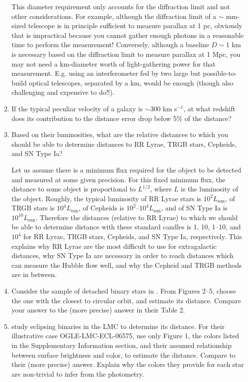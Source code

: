 \begin{enumerate}
\begin{answer}
This diameter requirement only accounts for the diffraction limit and
not other considerations. For example, although the diffraction limit
of a $\sim$ mm-sized telescope is in principle sufficient to measure
parallax at 1 pc, obviously that is impractical because you cannot
gather enough photons in a reasonable time to perform the measurement!
Conversely, although a baseline $D\sim 1$ km is necessary based on the
diffraction limit to measure parallax at 1 Mpc, you may not need a
km-diameter worth of light-gathering power for that measurement.
E.g. using an interferometer fed by two large but possible-to-build
optical telescopes, separated by a km, would be enough (though also
challenging and expensive to do!!).
\end{answer}

\item If the typical peculiar velocity of a galaxy is $\sim 300$ km
    s$^{-1}$, at what redshift does its contribution to the distance
   error drop below 5\% of the distance?
\item Based on their luminosities, what are the relative distances to
   which you should be able to determine distances to RR Lyrae,
   TRGB stars, Cepheids, and SN Type Ia?

\begin{answer}
Let us assume there is a minimum flux required for the object to be
detected and measured at some given precision. For this fixed minimum
flux, the distance to some object is proportional to $L^{1/2}$, where
$L$ is the luminosity of the object. Roughly, the typical luminosity
of RR Lyrae stars is $10^2 L_\text{sun}$, of TRGB stars is $10^4
L_\text{sun}$, of Cepheids is $10^2$--$10^4 L_\text{sun}$, and of SN
Type Ia is $10^{10}L_\text{sun}$. Therefore the distances (relative to
RR Lyrae) to which we should be able to determine distance with these
standard candles is 1, 10, 1--10, and $10^4$ for RR Lyrae, TRGB stars,
Cepheids, and SN Type Ia, respectively. This explains why RR Lyrae are
the most difficult to use for extragalactic distances, why SN Type Ia
are necessary in order to reach distances which can measure the Hubble
flow well, and why the Cepheid and TRGB methods are in between. 
\end{answer}

\item Consider the sample of detached binary stars
in \citet{gallenne23a}.  From Figures 2--5, choose the one with the
closest to circular orbit, and estimate its distance. Compare your
answer to the (more precise) answer in their Table 2.

\item \citet{pietrzynski13a} study eclipsing binaries in the LMC to
determine its distance. For their illustrative case
OGLE-LMC-ECL-06575, use only Figure 1, the colors listed in the
Supplementary Information section, and their assumed relationship
between surface brightness and color, to estimate the
distance. Compare to their (more precise) answer. Explain why the
colors they provide for each star are non-trivial to infer from the
photometry.
\end{enumerate}


